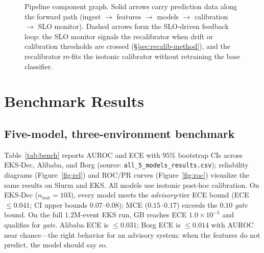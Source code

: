 \documentclass[conference]{IEEEtran}
\begin{document}
\begin{figure}[t]
\centering
{}
\caption{Pipeline component graph. Solid arrows carry prediction data along the forward path (ingest $\to$ features $\to$ models $\to$ calibration $\to$ SLO monitor). Dashed arrows form the SLO-driven feedback loop: the SLO monitor signals the recalibrator when drift or calibration thresholds are crossed (\S\ref{sec:recalib-method}), and the recalibrator re-fits the isotonic calibrator without retraining the base classifier.}
\label{fig:arch}
\end{figure}

\section{Benchmark Results}
\label{sec:bench}

\subsection{Five-model, three-environment benchmark}
Table~\ref{tab:bench} reports AUROC and ECE with $95\%$ bootstrap CIs across EKS-Dec, Alibaba, and Borg (source: \texttt{all\_5\_models\_results.csv}); reliability diagrams (Figure~\ref{fig:rel}) and ROC/PR curves (Figure~\ref{fig:roc}) visualize the same results on Slurm and EKS. All models use isotonic post-hoc calibration. On EKS-Dec ($n_{\text{test}}{=}103$), every model meets the \textit{advisory}-tier ECE bound (ECE $\leq 0.041$; CI upper bounds $0.07$--$0.08$); MCE ($0.15$--$0.17$) exceeds the $0.10$ \textit{gate} bound. On the full $1.2$M-event EKS run, GB reaches ECE $1.0\!\times\!10^{-5}$ and qualifies for \textit{gate}. Alibaba ECE is $\leq 0.031$; Borg ECE is $\leq 0.014$ with AUROC near chance---the right behavior for an advisory system: when the features do not predict, the model should say so.
\end{document}
